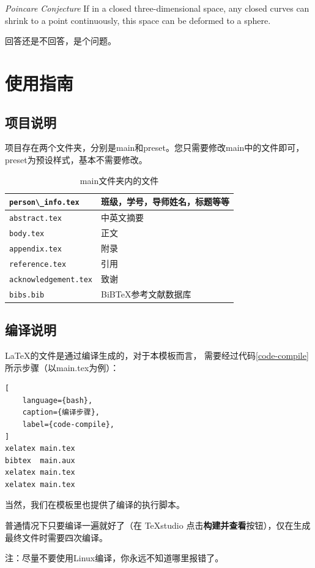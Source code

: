 \begin{conjecture}
    \label{thm-conjecture-example}
    \textit{Poincare Conjecture} If in a closed three-dimensional space,
    any closed curves can shrink to a point continuously,
    this space can be deformed to a sphere.
\end{conjecture}

\begin{problem}
    \label{thm-problem-example}
    回答还是不回答，是个问题。
\end{problem}


\chapter{使用指南}

\section{项目说明}
项目存在两个文件夹，分别是main和preset。您只需要修改main中的文件即可，preset为预设样式，基本不需要修改。

\begin{table}
    \centering
    \caption{main文件夹内的文件}
    \label{tab-space}
    \begin{tabular}{l|l}
        \hline
        \verb|person\_info.tex| & 班级，学号，导师姓名，标题等等 \\ \hline
        \verb|abstract.tex|  & 中英文摘要 \\ \hline
        \verb|body.tex|     & 正文 \\ \hline
        \verb|appendix.tex|     & 附录 \\ \hline
        \verb|reference.tex|     & 引用 \\ \hline
        \verb|acknowledgement.tex|     & 致谢 \\ \hline
        \verb|bibs.bib|     & BiBTeX参考文献数据库 \\ \hline
    \end{tabular}
\end{table}

\section{编译说明}
\LaTeX 的文件是通过编译生成的，对于本模板而言，
需要经过代码\ref{code-compile}所示步骤（以main.tex为例）：
\begin{lstlisting}[
    language={bash},
    caption={编译步骤},
    label={code-compile},
]
xelatex main.tex
bibtex  main.aux
xelatex main.tex
xelatex main.tex
\end{lstlisting}

当然，我们在模板里也提供了编译的执行脚本。

普通情况下只要编译一遍就好了（在 TeXstudio 点击{\bf 构建并查看}按钮），仅在生成最终文件时需要四次编译。

{\heiti 注：}尽量不要使用Linux编译，你永远不知道哪里报错了。
